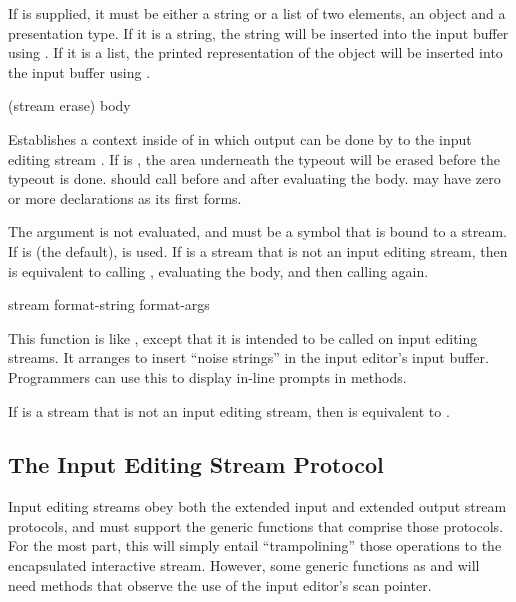 If  is supplied, it must be either a string or a list of
two elements, an object and a presentation type.  If it is a string, the string
will be inserted into the input buffer using .  If it is a
list, the printed representation of the object will be inserted into the input
buffer using .


 {(\optional stream \key erase) \body body} 

Establishes a context inside of  in which output can be
done by  to the input editing stream .  If  is
, the area underneath the typeout will be erased before the typeout
is done.   should call  before and
after evaluating the body.   may have zero or more declarations as its
first forms.

The  argument is not evaluated, and must be a symbol that is bound
to a stream.  If  is  (the default),  is
used.  If  is a stream that is not an input editing stream, then
 is equivalent to calling ,
evaluating the body, and then calling  again.

 {stream format-string \rest format-args}

This function is like , except that it is intended to be called on
input editing streams.  It arranges to insert ``noise strings'' in the input
editor's input buffer.  Programmers can use this to display in-line prompts in
 methods.

If  is a stream that is not an input editing stream, then
 is equivalent to .


\subsection {The Input Editing Stream Protocol}

Input editing streams obey both the extended input and extended output stream
protocols, and must support the generic functions that comprise those protocols.
For the most part, this will simply entail ``trampolining'' those operations to
the encapsulated interactive stream.  However, some generic functions as
 and  will need methods that
observe the use of the input editor's scan pointer.

